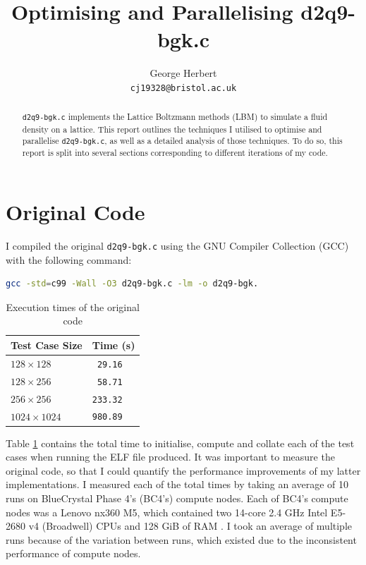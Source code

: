 \documentclass[11pt, twocolumn, a4paper]{article}
\author{
    George Herbert\\
    \texttt{cj19328@bristol.ac.uk}
}
\title{Optimising and Parallelising d2q9-bgk.c}
\begin{document}
\maketitle

\begin{abstract}
    \texttt{d2q9-bgk.c} implements the Lattice Boltzmann methods (LBM) to simulate a fluid density on a lattice.
    This report outlines the techniques I utilised to optimise and parallelise \texttt{d2q9-bgk.c}, as well as a detailed analysis of those techniques.
    To do so, this report is split into several sections corresponding to different iterations of my code.
\end{abstract}

\section{Original Code}

I compiled the original \texttt{d2q9-bgk.c} using the GNU Compiler Collection (GCC) with the following command:
\begin{lstlisting}[language=bash, breaklines=true, breakatwhitespace=true]
gcc -std=c99 -Wall -O3 d2q9-bgk.c -lm -o d2q9-bgk.
\end{lstlisting}

\begin{table}[htbp]
    \begin{center}
    \caption{Execution times of the original code}\label{tab:original}
    \begin{tabular}{l | l} 
        \hline\hline
        Test Case Size&Time (s)\\
        \hline
        $128 \times 128$&\texttt{ 29.16}\\
        $128 \times 256$&\texttt{ 58.71}\\
        $256 \times 256$&\texttt{233.32}\\
        $1024 \times 1024$&\texttt{980.89}\\
        \hline
      \end{tabular}
    \end{center}
\end{table} 

Table \ref{tab:original} contains the total time to initialise, compute and collate each of the test cases when running the ELF file produced.
It was important to measure the original code, so that I could quantify the performance improvements of my latter implementations.
I measured each of the total times by taking an average of 10 runs on BlueCrystal Phase 4's (BC4's) compute nodes.
Each of BC4's compute nodes was a Lenovo nx360 M5, which contained two 14-core 2.4 GHz Intel E5-2680 v4 (Broadwell) CPUs and 128 GiB of RAM \cite{bcp4}.
I took an average of multiple runs because of the variation between runs, which existed due to the inconsistent performance of compute nodes.
\end{document}
